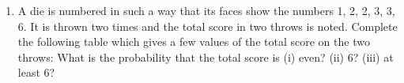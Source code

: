 \renewcommand{\theequation}{\theenumi}
\begin{enumerate}[label=\arabic*.,ref=\thesubsubsection.\theenumi]
\item
A die is numbered in such a way that its faces show the numbers 1, 2, 2, 3, 3, 6. It is thrown two times and the total score in two throws is noted. Complete the following
table which gives a few values of the total score on the two throws:
What is the probability that the total score is
(i) even? (ii) 6? (iii) at least 6?
%
\end{enumerate}
